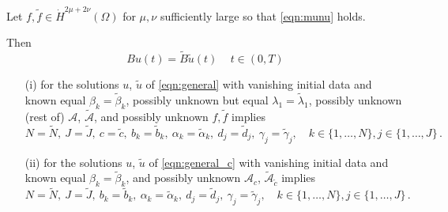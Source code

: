 \begin{theorem}\label{thm:uniqueness_smoothdata}
Let $f,\tilde{f}\in \dot{H}^{2\mu+2\nu}(\Omega)$ for $\mu,\nu$ sufficiently large so that \eqref{eqn:munu} holds.
 
Then
\[
B u(t) = \tilde B \tilde u(t)\, \quad t\in(0,T)
\]
\begin{enumerate}
\item[(i)] 
for the solutions $u$, $\tilde{u}$ of \eqref{eqn:general}
with vanishing initial data and known equal $\beta_k=\tilde{\beta}_k$, possibly unknown but equal $\lambda_1=\tilde{\lambda}_1$, possibly unknown (rest of) $\mathcal{A}$, $\tilde{\mathcal{A}}$, and possibly unknown $f,\tilde{f}$
implies
\[
N=\tilde{N}, \ J=\tilde{J}, \ c=\tilde{c}, \ b_k=\tilde{b}_k, \ \alpha_k=\tilde{\alpha}_k, \ d_j=\tilde{d}_j, \ \gamma_j=\tilde{\gamma}_j,\quad k\in\{1,\ldots,N\}, j\in\{1,\ldots,J\}\,. 
\]
\item[(ii)]
for the solutions $u$, $\tilde{u}$ of \eqref{eqn:general_c}
with vanishing initial data and known equal $\beta_k=\tilde{\beta}_k$, and possibly unknown $\mathcal{A}_c$, $\tilde{\mathcal{A}}_{\tilde{c}}$
implies
\[
N=\tilde{N}, \ J=\tilde{J}, \ b_k=\tilde{b}_k, \ \alpha_k=\tilde{\alpha}_k, \ d_j=\tilde{d}_j, \ \gamma_j=\tilde{\gamma}_j,\quad k\in\{1,\ldots,N\}, j\in\{1,\ldots,J\}\,. 
\]
\end{enumerate}
\end{theorem}

